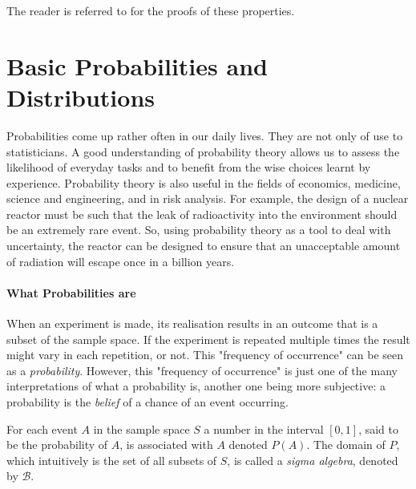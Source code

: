 \documentclass[
  oneside,
  11pt, a4paper,
  footinclude=true,
  headinclude=true,
  cleardoublepage=empty
]{scrbook}
\theoremstyle{definition}
\theoremstyle{definition}
\begin{document}
            The reader is referred to \cite{CaseBerg:01} for the proofs of these properties.
        
        \section{Basic Probabilities and Distributions}
        
            Probabilities come up rather often in our daily lives. They are not only of use to statisticians. A good understanding of probability theory allows us to assess the likelihood of everyday tasks and to benefit from the wise choices learnt by experience. Probability theory is also useful in the fields of economics, medicine, science and engineering, and in risk analysis. For example, the design of a nuclear reactor must be such that the leak of radioactivity into the environment should be an extremely rare event. So, using probability theory as a tool to deal with uncertainty, the reactor can be designed to ensure that an unacceptable amount of radiation will escape once in a billion years.
            
	        \paragraph{What Probabilities are}
            
                When an experiment is made, its realisation results in an outcome that is a subset of the sample space. If the experiment is repeated multiple times the result might vary in each repetition, or not. This "frequency of occurrence" can be seen as a \emph{probability}. %
                However, this "frequency of occurrence" is just one of the many interpretations of what a probability is, another one being more subjective: a probability is the \emph{belief} of a chance of an event occurring.
                
                For each event $A$ in the sample space $S$ a number in the interval $[0, 1]$, said to be the probability of $A$, is associated with $A$ denoted $P(A)$. The domain of $P$, which intuitively is the set of all subsets of $S$, is called a \emph{sigma algebra}, denoted by $\mathscr{B}$.%
                
\end{document}
